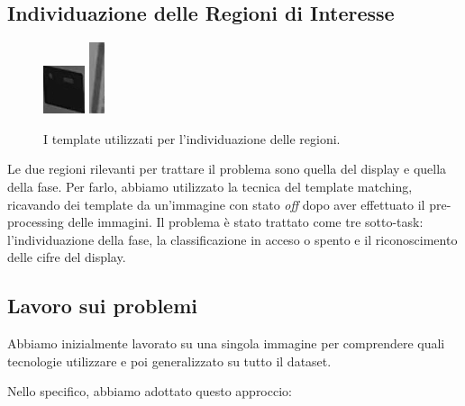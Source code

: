 \documentclass{article}
\begin{document}
\subsection{Individuazione delle Regioni di
Interesse}\label{individuazione-delle-regioni-di-interesse}

\begin{figure}[h!]
  \centering
  \includegraphics[scale=3]{display_template}
  \includegraphics[scale=0.65]{template_bar}
  \caption{I template utilizzati per l'individuazione delle regioni.}
\end{figure}

\par Le due regioni rilevanti per trattare il problema sono quella del
display e quella della fase. Per farlo, abbiamo utilizzato la tecnica
del template matching\citep{jain2000statistical}\citep{hart2000pattern}, ricavando dei template da un'immagine con stato
\textit{off} dopo aver effettuato il pre-processing delle immagini. Il
problema è stato trattato come tre sotto-task: l'individuazione della fase,
la classificazione in acceso o spento e il riconoscimento delle cifre del display.

\subsection{Lavoro sui problemi}\label{lavoro-sui-problemi}

\par Abbiamo inizialmente lavorato su una singola immagine per comprendere
quali tecnologie utilizzare e poi generalizzato su tutto il dataset.
\par Nello specifico, abbiamo adottato questo approccio:
\end{document}
